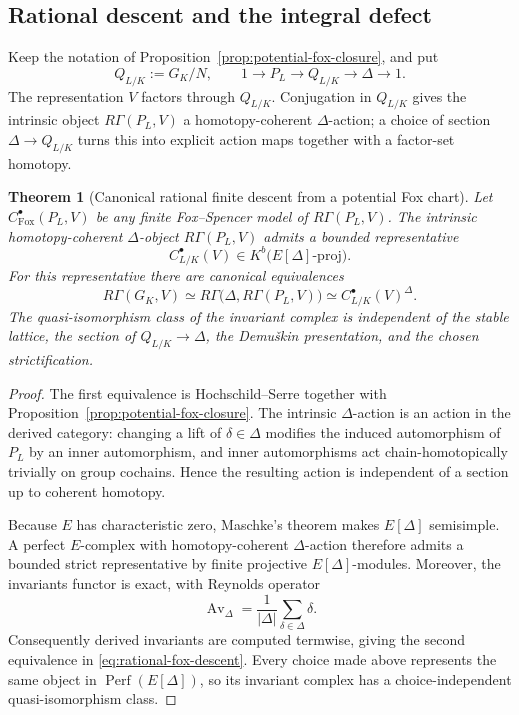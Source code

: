 \documentclass[11pt]{article}
\newtheorem{theorem}{Theorem}[section]
\theoremstyle{definition}
\begin{document}
\subsection{Rational descent and the integral defect}

Keep the notation of Proposition~\ref{prop:potential-fox-closure}, and put
\[
Q_{L/K}:=G_K/N,
\qquad
1\longrightarrow P_L\longrightarrow Q_{L/K}\longrightarrow\Delta\longrightarrow1.
\]
The representation $V$ factors through $Q_{L/K}$.  Conjugation in $Q_{L/K}$ gives the intrinsic object $R\Gamma(P_L,V)$ a homotopy-coherent $\Delta$-action; a choice of section $\Delta\to Q_{L/K}$ turns this into explicit action maps together with a factor-set homotopy.

\begin{theorem}[Canonical rational finite descent from a potential Fox chart]\label{thm:rational-fox-descent}
Let $C^\bullet_{\mathrm{Fox}}(P_L,V)$ be any finite Fox--Spencer model of $R\Gamma(P_L,V)$.  The intrinsic homotopy-coherent $\Delta$-object $R\Gamma(P_L,V)$ admits a bounded representative
\[
C^\bullet_{L/K}(V)\in K^b\bigl(E[\Delta]\text{-}\mathrm{proj}\bigr).
\]
For this representative there are canonical equivalences
\begin{equation}\label{eq:rational-fox-descent}
R\Gamma(G_K,V)
\simeq
R\Gamma\bigl(\Delta,R\Gamma(P_L,V)\bigr)
\simeq
C^\bullet_{L/K}(V)^\Delta.
\end{equation}
The quasi-isomorphism class of the invariant complex is independent of the stable lattice, the section of $Q_{L/K}\to\Delta$, the Demu\v{s}kin presentation, and the chosen strictification.
\end{theorem}

\begin{proof}
The first equivalence is Hochschild--Serre together with Proposition~\ref{prop:potential-fox-closure}.  The intrinsic $\Delta$-action is an action in the derived category: changing a lift of $\delta\in\Delta$ modifies the induced automorphism of $P_L$ by an inner automorphism, and inner automorphisms act chain-homotopically trivially on group cochains.  Hence the resulting action is independent of a section up to coherent homotopy.

Because $E$ has characteristic zero, Maschke's theorem makes $E[\Delta]$ semisimple.  A perfect $E$-complex with homotopy-coherent $\Delta$-action therefore admits a bounded strict representative by finite projective $E[\Delta]$-modules.  Moreover, the invariants functor is exact, with Reynolds operator
\[
\operatorname{Av}_\Delta
=\frac1{|\Delta|}\sum_{\delta\in\Delta}\delta.
\]
Consequently derived invariants are computed termwise, giving the second equivalence in \eqref{eq:rational-fox-descent}.  Every choice made above represents the same object in $\operatorname{Perf}(E[\Delta])$, so its invariant complex has a choice-independent quasi-isomorphism class.
\end{proof}
\end{document}
